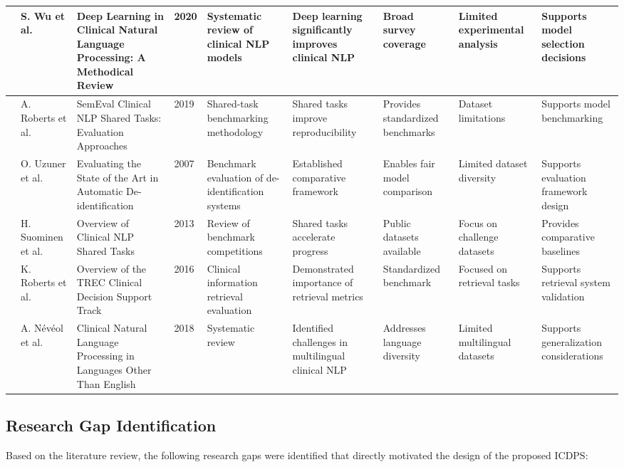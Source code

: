 \begin{landscape}
\begin{singlespace}
\begin{longtable}{|p{0.8cm}|p{1.8cm}|p{3.2cm}|p{0.8cm}|p{3.6cm}|p{3.6cm}|p{2.5cm}|p{2.5cm}|p{3.2cm}|}
\hline
\cite{ref70} & S. Wu et al. & Deep Learning in Clinical Natural Language Processing: A Methodical Review & 2020 & Systematic review of clinical NLP models & Deep learning significantly improves clinical NLP & Broad survey coverage & Limited experimental analysis & Supports model selection decisions \\
\hline
\cite{ref71} & A. Roberts et al. & SemEval Clinical NLP Shared Tasks: Evaluation Approaches & 2019 & Shared-task benchmarking methodology & Shared tasks improve reproducibility & Provides standardized benchmarks & Dataset limitations & Supports model benchmarking \\
\hline
\cite{ref72} & O. Uzuner et al. & Evaluating the State of the Art in Automatic De-identification & 2007 & Benchmark evaluation of de-identification systems & Established comparative framework & Enables fair model comparison & Limited dataset diversity & Supports evaluation framework design \\
\hline
\cite{ref73} & H. Suominen et al. & Overview of Clinical NLP Shared Tasks & 2013 & Review of benchmark competitions & Shared tasks accelerate progress & Public datasets available & Focus on challenge datasets & Provides comparative baselines \\
\hline
\cite{ref74} & K. Roberts et al. & Overview of the TREC Clinical Decision Support Track & 2016 & Clinical information retrieval evaluation & Demonstrated importance of retrieval metrics & Standardized benchmark & Focused on retrieval tasks & Supports retrieval system validation \\
\hline
\cite{ref75} & A. N\'ev\'eol et al. & Clinical Natural Language Processing in Languages Other Than English & 2018 & Systematic review & Identified challenges in multilingual clinical NLP & Addresses language diversity & Limited multilingual datasets & Supports generalization considerations \\
\hline
\end{longtable}
\end{singlespace}
\end{landscape}

\subsection[Research Gap Identification]{\textbf{Research Gap Identification}}

Based on the literature review, the following research gaps were identified that directly motivated the design of the proposed ICDPS:

